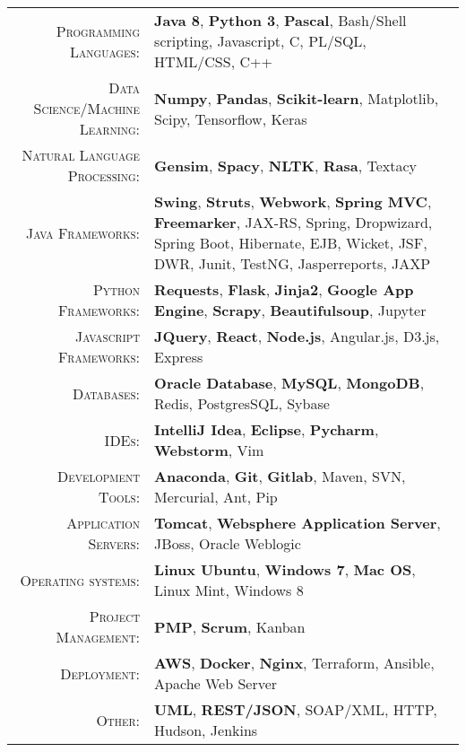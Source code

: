 %
%
%

\renewcommand{\arraystretch}{1.1}
	\begin{tabular}{>{}r>{}p{13cm}} 
		\textsc{Programming Languages:}  		&   \textbf{Java 8}, \textbf{Python 3}, \textbf{Pascal}, Bash/Shell scripting, Javascript, C, PL/SQL,  HTML/CSS, C++\\ 
		\textsc{Data Science/Machine Learning:}                  &   \textbf{Numpy}, \textbf{Pandas}, \textbf{Scikit-learn}, Matplotlib, Scipy, Tensorflow, Keras\\
		\textsc{Natural Language Processing:} 	 & \textbf{Gensim}, \textbf{Spacy}, \textbf{NLTK}, \textbf{Rasa}, Textacy\\
		\textsc{Java Frameworks:} 				& \textbf{Swing}, \textbf{Struts}, \textbf{Webwork}, \textbf{Spring MVC}, \textbf{Freemarker}, JAX-RS, Spring, Dropwizard, Spring Boot, Hibernate, EJB, Wicket, JSF, DWR, Junit, TestNG, Jasperreports, JAXP \\
		\textsc{Python Frameworks:} 				& \textbf{Requests}, \textbf{Flask}, \textbf{Jinja2}, \textbf{Google App Engine}, \textbf{Scrapy}, \textbf{Beautifulsoup}, Jupyter\\ 
		\textsc{Javascript Frameworks:} 				& \textbf{JQuery}, \textbf{React}, \textbf{Node.js}, Angular.js, D3.js, Express \\
		\textsc{Databases:}                  &   \textbf{Oracle Database}, \textbf{MySQL}, \textbf{MongoDB}, Redis, PostgresSQL, Sybase \\ 
		\textsc{IDEs:}	  		&   \textbf{IntelliJ Idea}, \textbf{Eclipse}, \textbf{Pycharm}, \textbf{Webstorm}, Vim  \\ 
		\textsc{Development Tools:} & 	  		\textbf{Anaconda}, \textbf{Git}, \textbf{Gitlab}, Maven, SVN, Mercurial, Ant, Pip \\
		\textsc{Application Servers:}				        &   \textbf{Tomcat}, \textbf{Websphere Application Server}, JBoss, Oracle Weblogic \\ 
		\textsc{Operating systems:}	        &   \textbf{Linux Ubuntu}, \textbf{Windows 7}, \textbf{Mac OS}, Linux Mint, Windows 8\\ 
		\textsc{Project Management:}				        &   \textbf{PMP}, \textbf{Scrum}, Kanban \\
		\textsc{Deployment:}				        &   \textbf{AWS}, \textbf{Docker}, \textbf{Nginx}, Terraform, Ansible, Apache Web Server\\
		\textsc{Other:}					        &   \textbf{UML}, \textbf{REST/JSON}, SOAP/XML, HTTP, Hudson, Jenkins \\
	\end{tabular}